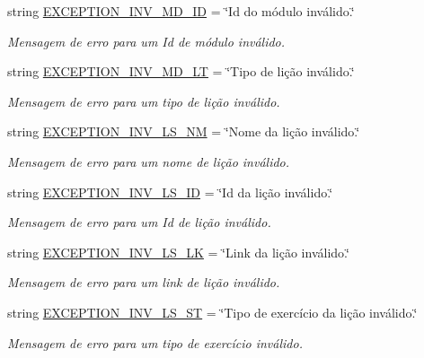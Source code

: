 \begin{DoxyCompactItemize}
string \hyperlink{namespaceELO_1_1lang_1_1pt__br_a872dcdcb3db33175e29767d824e793dc}{E\-X\-C\-E\-P\-T\-I\-O\-N\-\_\-\-I\-N\-V\-\_\-\-M\-D\-\_\-\-I\-D} = \char`\"{}Id do módulo inválido.\char`\"{}
\begin{DoxyCompactList}\small\item\em Mensagem de erro para um Id de módulo inválido. \end{DoxyCompactList}\item 
string \hyperlink{namespaceELO_1_1lang_1_1pt__br_af8ca0e427b35f18491bbe38c779364be}{E\-X\-C\-E\-P\-T\-I\-O\-N\-\_\-\-I\-N\-V\-\_\-\-M\-D\-\_\-\-L\-T} = \char`\"{}Tipo de lição inválido.\char`\"{}
\begin{DoxyCompactList}\small\item\em Mensagem de erro para um tipo de lição inválido. \end{DoxyCompactList}\item 
string \hyperlink{namespaceELO_1_1lang_1_1pt__br_a72209416e042d08c26b622b627159447}{E\-X\-C\-E\-P\-T\-I\-O\-N\-\_\-\-I\-N\-V\-\_\-\-L\-S\-\_\-\-N\-M} = \char`\"{}Nome da lição inválido.\char`\"{}
\begin{DoxyCompactList}\small\item\em Mensagem de erro para um nome de lição inválido. \end{DoxyCompactList}\item 
string \hyperlink{namespaceELO_1_1lang_1_1pt__br_a4cb871dfcc7ccbcb5d6c9fb79d5cccd2}{E\-X\-C\-E\-P\-T\-I\-O\-N\-\_\-\-I\-N\-V\-\_\-\-L\-S\-\_\-\-I\-D} = \char`\"{}Id da lição inválido.\char`\"{}
\begin{DoxyCompactList}\small\item\em Mensagem de erro para um Id de lição inválido. \end{DoxyCompactList}\item 
string \hyperlink{namespaceELO_1_1lang_1_1pt__br_a589fee1f3bb945bc031bbd6c0c569c09}{E\-X\-C\-E\-P\-T\-I\-O\-N\-\_\-\-I\-N\-V\-\_\-\-L\-S\-\_\-\-L\-K} = \char`\"{}Link da lição inválido.\char`\"{}
\begin{DoxyCompactList}\small\item\em Mensagem de erro para um link de lição inválido. \end{DoxyCompactList}\item 
string \hyperlink{namespaceELO_1_1lang_1_1pt__br_a17ad35af02ab988d2ce5218b0b4b16d1}{E\-X\-C\-E\-P\-T\-I\-O\-N\-\_\-\-I\-N\-V\-\_\-\-L\-S\-\_\-\-S\-T} = \char`\"{}Tipo de exercício da lição inválido.\char`\"{}
\begin{DoxyCompactList}\small\item\em Mensagem de erro para um tipo de exercício inválido. \end{DoxyCompactList}\item 

\end{DoxyCompactItemize}
